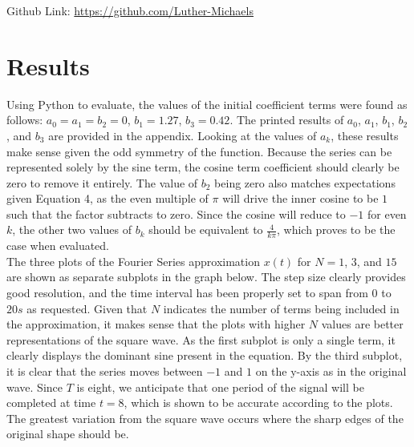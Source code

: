\documentclass[12pt]{report}
\begin{document}
Github Link: \url{https://github.com/Luther-Michaels} \\

\section{Results}

Using Python to evaluate, the values of the initial coefficient terms were found as follows: $ a_0 = a_1 = b_2 = 0 $, $ b_1 = 1.27 $, $ b_3 = 0.42 $. The printed results of $ a_0 $, $ a_1 $, $ b_1 $, $ b_2 $, and $ b_3 $ are provided in the appendix. Looking at the values of $ a_k $, these results make sense given the odd symmetry of the function. Because the series can be represented solely by the sine term, the cosine term coefficient should clearly be zero to remove it entirely. The value of $ b_2 $ being zero also matches expectations given Equation 4, as the even multiple of $ \pi $ will drive the inner cosine to be $ 1 $ such that the factor subtracts to zero. Since the cosine will reduce to $ -1 $ for even $ k $, the other two values of $ b_k $ should be equivalent to $\frac{4}{k\pi} $, which proves to be the case when evaluated. \\

The three plots of the Fourier Series approximation $ x(t) $ for $ N = 1 $, $ 3 $, and $ 15 $ are shown as separate subplots in the graph below. The step size clearly provides good resolution, and the time interval has been properly set to span from $ 0 $ to $ 20s $ as requested. Given that $ N $ indicates the number of terms being included in the approximation, it makes sense that the plots with higher $ N $ values are better representations of the square wave. As the first subplot is only a single term, it clearly displays the dominant sine present in the equation. By the third subplot, it is clear that the series moves between $ -1 $ and $ 1 $ on the y-axis as in the original wave. Since $ T $ is eight, we anticipate that one period of the signal will be completed at time $ t = 8 $, which is shown to be accurate according to the plots. The greatest variation from the square wave occurs where the sharp edges of the original shape should be. \\
\end{document}
